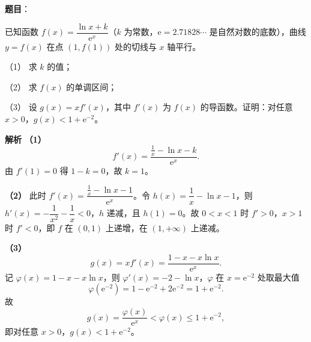 \begin{answer}

\textbf{题目}：

已知函数 $f(x)=\dfrac{\ln x+k}{\mathrm e^x}$（$k$ 为常数，$\mathrm e=2.71828\cdots$ 是自然对数的底数），曲线 $y=f(x)$ 在点 $(1,f(1))$ 处的切线与 $x$ 轴平行。

（1） 求 $k$ 的值；

（2） 求 $f(x)$ 的单调区间；

（3） 设 $g(x)=xf'(x)$，其中 $f'(x)$ 为 $f(x)$ 的导函数。证明：对任意 $x>0$，$g(x)<1+\mathrm e^{-2}$。

\textbf{解析}
\textbf{（1）}
\nopagebreak[4]
\[f'(x)=\frac{\frac1x-\ln x-k}{\mathrm e^x}.\]
由 $f'(1)=0$ 得 $1-k=0$，故 $k=1$。

\textbf{（2）} 此时 $f'(x)=\dfrac{\frac1x-\ln x-1}{\mathrm e^x}$。令 $h(x)=\dfrac1x-\ln x-1$，则 $h'(x)=-\dfrac1{x^2}-\dfrac1x<0$，$h$ 递减，且 $h(1)=0$。故 $0<x<1$ 时 $f'>0$，$x>1$ 时 $f'<0$，即 $f$ 在 $(0,1)$ 上递增，在 $(1,+\infty)$ 上递减。

\textbf{（3）}
\nopagebreak[4]
\[g(x)=xf'(x)=\frac{1-x-x\ln x}{\mathrm e^x}.\]
记 $\varphi(x)=1-x-x\ln x$，则 $\varphi'(x)=-2-\ln x$，$\varphi$ 在 $x=\mathrm e^{-2}$ 处取最大值
\nopagebreak[4]
\[\varphi(\mathrm e^{-2})=1-\mathrm e^{-2}+2\mathrm e^{-2}=1+\mathrm e^{-2}.\]
故
\nopagebreak[4]
\[g(x)=\frac{\varphi(x)}{\mathrm e^x}<\varphi(x)\leqslant1+\mathrm e^{-2},\]
即对任意 $x>0$，$g(x)<1+\mathrm e^{-2}$。




\end{answer}
